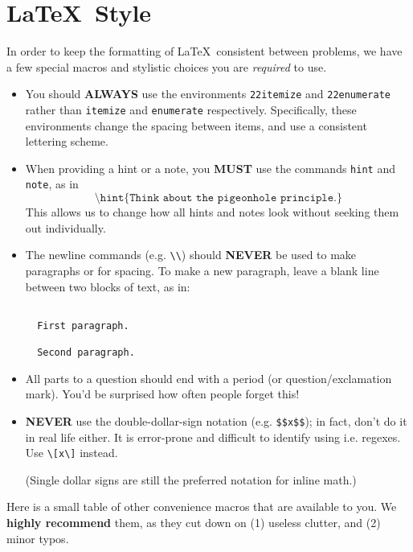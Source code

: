 \section{\LaTeX\ Style}
  In order to keep the formatting of \LaTeX\ consistent between problems, we have a few special macros and stylistic choices you are \textit{required} to use.
  
  \begin{itemize}
    \item You should \textbf{ALWAYS} use the environments \texttt{22itemize} and \texttt{22enumerate} rather than \texttt{itemize} and \texttt{enumerate} respectively. Specifically, these environments change the spacing between items, and use a consistent lettering scheme.
    \item When providing a hint or a note, you \textbf{MUST} use the commands \texttt{hint} and \texttt{note}, as in \[\texttt{\textbackslash hint\{Think about the pigeonhole principle.\}}\] This allows us to change how all hints and notes look without seeking them out individually.
    \item The newline commands (e.g. \texttt{\textbackslash\textbackslash}) should \textbf{NEVER} be used to make paragraphs or for spacing. To make a new paragraph, leave a blank line between two blocks of text, as in: \begin{verbatim}

  First paragraph.
  
  Second paragraph.

    \end{verbatim}
    \item All parts to a question should end with a period (or question/exclamation mark). You'd be surprised how often people forget this!
    \item \textbf{NEVER} use the double-dollar-sign notation (e.g. \texttt{\$\$x\$\$}); in fact, don't do it in real life either. It is error-prone and difficult to identify using i.e. regexes. Use \texttt{\textbackslash[x\textbackslash]} instead.
    
    (Single dollar signs are still the preferred notation for inline math.)
  \end{itemize}
  
  Here is a small table of other convenience macros that are available to you. We \textbf{highly recommend} them, as they cut down on (1) useless clutter, and (2) minor typos.
  
